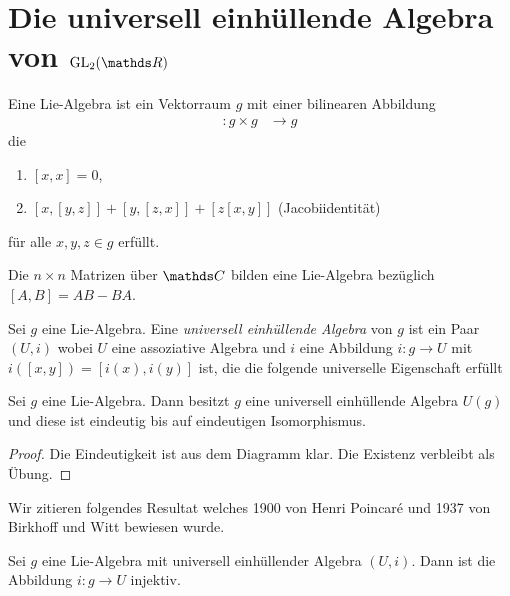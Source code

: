 \chapter{Die universell einhüllende Algebra von $\GL_2(\R)$}
Eine Lie-Algebra ist ein Vektorraum $g$ mit einer bilinearen Abbildung
\begin{align*}
[\cdot,\cdot] \colon g \times g &\to g
\end{align*}
die
\begin{enumerate}
\item $[x,x]=0$,
\item $[x,[y,z]]+[y,[z,x]]+[z[x,y]]$ (Jacobiidentität)
\end{enumerate}
für alle $x,y,z \in g$ erfüllt.

\begin{bsp}
Die $n\times n$ Matrizen über $\C$ bilden eine Lie-Algebra bezüglich $[A,B]=AB-BA$.
\end{bsp}

\begin{defi}
Sei $g$ eine Lie-Algebra. Eine \emph{universell einhüllende Algebra} von $g$ ist ein Paar $(U,i)$ wobei $U$ eine assoziative Algebra und
$i$ eine Abbildung $i\colon g \to U$ mit
$i([x,y])=[i(x),i(y)]$ ist, die die folgende universelle Eigenschaft erfüllt


\end{defi}

\begin{prop}
Sei $g$ eine Lie-Algebra.
Dann besitzt $g$ eine universell einhüllende Algebra $U(g)$ und diese ist eindeutig bis auf eindeutigen Isomorphismus.
\end{prop}
\begin{proof}
Die Eindeutigkeit ist aus dem Diagramm klar.
Die Existenz verbleibt als Übung.
\end{proof}

Wir zitieren folgendes Resultat welches 1900 von Henri Poincaré und 1937 von Birkhoff und Witt bewiesen wurde.
\begin{thm}
Sei $g$ eine Lie-Algebra mit universell einhüllender Algebra $(U,i)$.
Dann ist die Abbildung $i\colon g \to U$ injektiv.
\end{thm}

